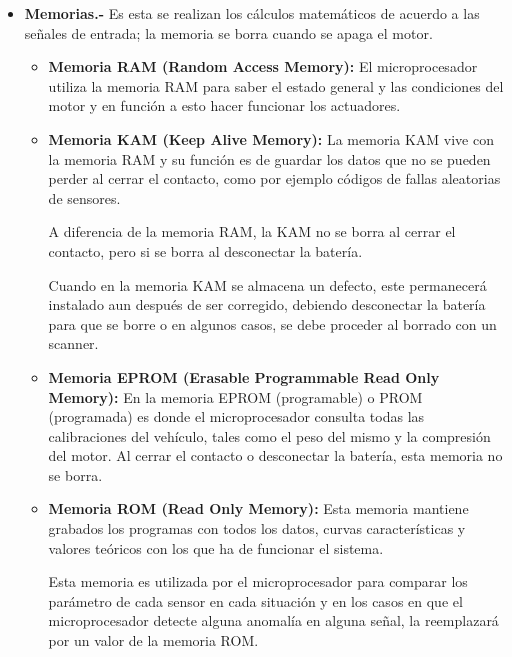 \begin{itemize}
    \begin{itemize}
        \item \textbf{Memorias.-} Es esta se realizan los cálculos matemáticos de acuerdo a las señales de entrada; la memoria se borra cuando se apaga el motor. 
        \begin{itemize}
            \item \textbf{Memoria RAM (Random Access Memory):} El microprocesador utiliza la memoria RAM para saber el estado general y las condiciones del motor y en función a esto hacer funcionar los actuadores. 
            \item \textbf{Memoria KAM (Keep Alive Memory):} La memoria KAM vive con la memoria RAM y su función es de guardar los datos que no se pueden perder al cerrar el contacto, como por ejemplo códigos de fallas aleatorias de sensores.
            
            A diferencia de la memoria RAM, la KAM no se borra al cerrar el contacto, pero si se borra al desconectar la batería.
            
            Cuando en la memoria KAM se almacena un defecto, este permanecerá instalado aun después de ser corregido, debiendo desconectar la batería para que se borre o en algunos casos, se debe proceder al borrado con un scanner. 
            \item \textbf{Memoria EPROM (Erasable Programmable Read Only Memory):} En la memoria EPROM (programable) o PROM (programada) es donde el microprocesador consulta todas las calibraciones del vehículo, tales como el peso del mismo y la compresión del motor. Al cerrar el contacto o desconectar la batería, esta memoria no se borra. 
            \item \textbf{Memoria ROM (Read Only Memory):} Esta memoria mantiene grabados los programas con todos los datos, curvas características y valores teóricos con los que ha de funcionar el sistema.
            
            Esta memoria es utilizada por el microprocesador para comparar los parámetro de cada sensor en cada situación y en los casos en que el microprocesador detecte alguna anomalía en alguna señal, la reemplazará por un valor de la memoria ROM.
            

\end{itemize}
\end{itemize}
\end{itemize}
